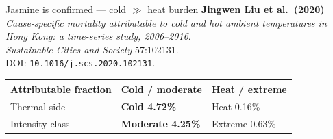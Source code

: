 \begin{frame}{Jasmine is confirmed --- cold $\gg$ heat burden}
  \footnotesize
  \textbf{Jingwen Liu et al.\ (2020)}\\
  \emph{Cause-specific mortality attributable to cold and hot ambient temperatures
  in Hong Kong: a time-series study, 2006--2016}.\\
  \textit{Sustainable Cities and Society} 57:102131.\\
  DOI: \texttt{10.1016/j.scs.2020.102131}.

  \vspace{0.55em}
  \renewcommand{\arraystretch}{1.18}
  \begin{tabular}{@{}p{}p{}p{}@{}}
    \toprule
    \textbf{Attributable fraction} & \textbf{Cold / moderate} & \textbf{Heat / extreme} \\
    \midrule
    Thermal side & \textbf{Cold 4.72\%} & Heat 0.16\% \\
    Intensity class & \textbf{Moderate 4.25\%} & Extreme 0.63\% \\
    \bottomrule
  \end{tabular}

  \vspace{0.5em}
\end{frame}

